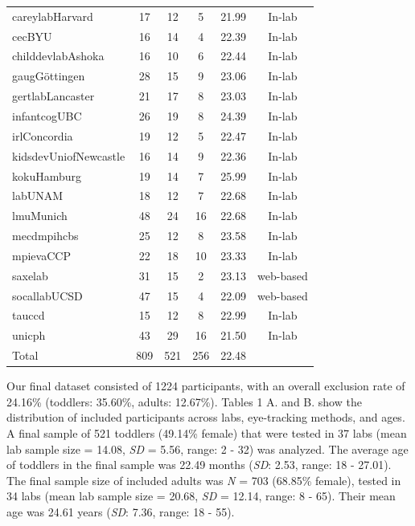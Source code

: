 \documentclass[
  english,
  man,floatsintext]{apa6}
\begin{document}
\begin{center}
\begin{ThreePartTable}
{\begin{longtable}{lccccc}
careylabHarvard & 17 & 12 & 5 & 21.99 & In-lab\\
cecBYU & 16 & 14 & 4 & 22.39 & In-lab\\
childdevlabAshoka & 16 & 10 & 6 & 22.44 & In-lab\\
gaugGöttingen & 28 & 15 & 9 & 23.06 & In-lab\\
gertlabLancaster & 21 & 17 & 8 & 23.03 & In-lab\\
infantcogUBC & 26 & 19 & 8 & 24.39 & In-lab\\
irlConcordia & 19 & 12 & 5 & 22.47 & In-lab\\
kidsdevUniofNewcastle & 16 & 14 & 9 & 22.36 & In-lab\\
kokuHamburg & 19 & 14 & 7 & 25.99 & In-lab\\
labUNAM & 18 & 12 & 7 & 22.68 & In-lab\\
lmuMunich & 48 & 24 & 16 & 22.68 & In-lab\\
mecdmpihcbs & 25 & 12 & 8 & 23.58 & In-lab\\
mpievaCCP & 22 & 18 & 10 & 23.33 & In-lab\\
saxelab & 31 & 15 & 2 & 23.13 & web-based\\
socallabUCSD & 47 & 15 & 4 & 22.09 & web-based\\
tauccd & 15 & 12 & 8 & 22.99 & In-lab\\
unicph & 43 & 29 & 16 & 21.50 & In-lab\\
Total & 809 & 521 & 256 & 22.48 & \\
\bottomrule
\end{longtable}

}

\end{ThreePartTable}
\end{center}

Our final dataset consisted of 1224 participants, with an overall exclusion rate of 24.16\% (toddlers: 35.60\%, adults: 12.67\%).
Tables 1 A. and B. show the distribution of included participants across labs, eye-tracking methods, and ages.
A final sample of 521 toddlers (49.14\% female) that were tested in 37 labs (mean lab sample size = 14.08, \emph{SD} = 5.56, range: 2 - 32) was analyzed.
The average age of toddlers in the final sample was 22.49 months (\emph{SD}: 2.53, range: 18 - 27.01).
The final sample size of included adults was \emph{N} = 703 (68.85\% female), tested in 34 labs (mean lab sample size = 20.68, \emph{SD} = 12.14, range: 8 - 65).
Their mean age was 24.61 years (\emph{SD}: 7.36, range: 18 - 55).
\end{document}
